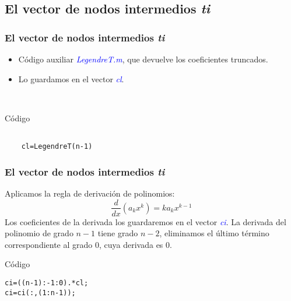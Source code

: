 \documentclass{beamer}
\begin{document}
\subsection{El vector de nodos intermedios \textit{ti}}
\begin{frame}[fragile]
\frametitle{El vector de nodos intermedios \textit{ti}}

\textbf{}
\begin{itemize}
    \item Código auxiliar \textcolor{blue}{\textit{LegendreT.m}}, que devuelve los coeficientes truncados.
    \item Lo guardamos en el vector \textcolor{blue}{\textit{cl}}.
\end{itemize} \\

\begin{exampleblock}{Código}
    \begin{verbatim}

    cl=LegendreT(n-1)
    \end{verbatim}
    \end{exampleblock}
\end{frame}


\begin{frame}[fragile]
\frametitle{El vector de nodos intermedios \textit{ti}}
\textbf{}

Aplicamos la regla de derivación de polinomios:
\[
\frac{d}{dx}(a_k x^k)=k a_k x^{k-1}
\]
Los coeficientes de la derivada los guardaremos en el vector \textcolor{blue}{\textit{ci}}.
La derivada del polinomio de grado $n-1$ tiene grado $n-2$, eliminamos el último término correspondiente al grado 0, cuya derivada es 0. \\ 
\begin{exampleblock}{Código}
\begin{verbatim}
ci=((n-1):-1:0).*cl; 
ci=ci(:,(1:n-1));
\end{verbatim}
\end{exampleblock}
\end{frame}

\end{document}
